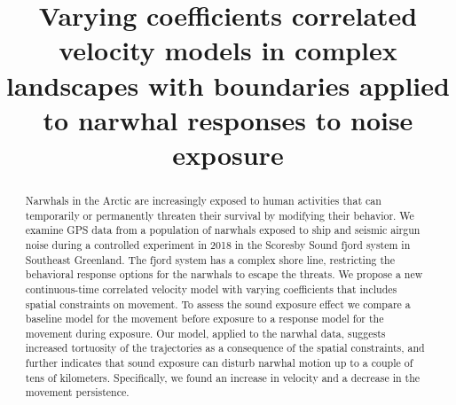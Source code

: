 \documentclass[aoas]{imsart}
\theoremstyle{definition}
\theoremstyle{remark}
\theoremstyle{remark}
\newcommand {\1}{\mathbb{1}}
\begin{document}
\begin{frontmatter}
\title{Varying coefficients correlated velocity models in complex landscapes with boundaries applied to narwhal responses to noise exposure}


\begin{abstract}
Narwhals in the Arctic are increasingly exposed to human activities that can temporarily or permanently threaten their survival by modifying their behavior. We examine GPS data from a population of narwhals exposed to ship and seismic airgun noise during a controlled experiment in 2018 in the Scoresby Sound fjord system in Southeast Greenland. The fjord system has a complex shore line, restricting the behavioral response options for the narwhals to escape the threats. We propose a new continuous-time correlated velocity model with varying coefficients that includes spatial constraints on movement. To assess the sound exposure effect we compare a baseline model for the movement before exposure to a response model for the movement during exposure. Our model, applied to the narwhal data, suggests increased tortuosity of the trajectories as a consequence of the spatial constraints, and further indicates that sound exposure can disturb narwhal motion up to a couple of tens of kilometers. Specifically, we found an increase in velocity and a decrease in the movement persistence.
\end{abstract}


\end{frontmatter}
\end{document}
